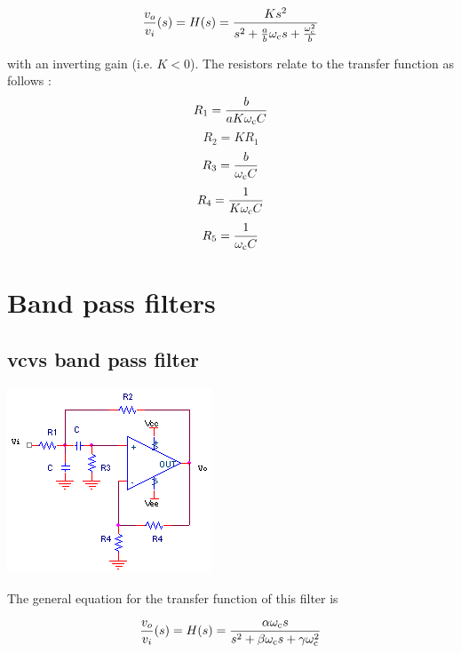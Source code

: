 \textcolor{red}{
\begin{equation}
\frac{\vout}{\vin}(s) = \Hs = \frac{Ks^2}{s^2 + \frac{a}{b}\wcutoff s + \frac{\wcutoff^2}{b}}
\label{eq:2ndorderbiquadHPfilter}
\end{equation}
}

with an inverting gain (i.e. $K < 0$).
The resistors relate to the transfer function as follows \autocite[131]{op-amp-circuits-johnson}:
\begin{equation}
R_1 = \frac{b}{a K\omega_\mathrm{c} C}
\end{equation}
\begin{equation}
R_2 = K R_1
\end{equation}
\begin{equation}
R_3 = \frac{b}{\omega_\mathrm{c} C}
\end{equation}
\begin{equation}
R_4 = \frac{1}{K\omega_\mathrm{c} C}
\end{equation}
\begin{equation}
R_5 = \frac{1}{\omega_\mathrm{c} C}
\end{equation}

\section{Band pass filters}

\subsection{\acs{vcvs} band pass filter}
\begin{center}
	\includegraphics{schematics/vcvs_bandpass.PNG}
\end{center}
The general equation for the transfer function of this filter is

\textcolor{red}{
\begin{equation}
\frac{\vout}{\vin}(s) = \Hs = \frac{\alpha \wcutoff s}{s^2+\beta \wcutoff s + \gamma \wcutoff^2}
\label{eq:vcvs_bandpass}
\end{equation}
}

